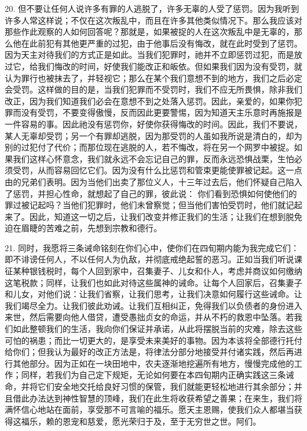 20. 但不要让任何人说许多有罪的人逃脱了，许多无辜的人受了惩罚。因为我听到许多人常这样说；不仅在这次叛乱中，而且在许多其他类似情况下。那么我应该对那些作此观察的人如何回答呢？那就是，如果被捉的人在这次叛乱中是无辜的，那么他在此前犯有其他更严重的过犯，由于他事后没有悔改，就在此时受到了惩罚。因为天主对待我们的方式正是如此。当我们犯罪时，祂并不立即惩罚过犯，而是放过它，给我们悔改的时间，好使我们能改正和皈依。但如果我们因为没有受罚，就认为罪行也被抹去了，并轻视它；那么在某个我们意想不到的地方，我们之后必定会受罚。这样做的目的是，当我们犯罪而不受罚时，我们不应无所畏惧，除非我们改正，因为我们知道我们必会在意想不到之处落入惩罚。因此，亲爱的，如果你犯罪而没有受罚，不要变得傲慢，反而因此更要警惕，因为知道天主乐意时再施报是一件容易的事。因此祂没有惩罚你，好使你获得悔改的时间。因此，我们不要说，某人无辜却受罚；另一个有罪却逃脱，因为那受罚的人虽如我所说是清白的，却为别的过犯付了代价；而那位现在逃脱的人，若不悔改，将在另一个网罗中被捉。如果我们这样心怀意念，我们就永远不会忘记自己的罪，反而永远恐惧战栗，生怕必须受罚，从而容易回忆它们。因为没有什么比惩罚和管束更能使罪被记起。这一点由的兄弟们表明。因为当他们出卖了那位义人，十三年过去后，他们怀疑自己陷入了惩罚，并担心性命，就想起了自己的罪，彼此说：  你们看到恐惧如何使他们的罪过被记起吗？当他们犯罪时，他们未曾察觉；但当他们害怕受罚时，他们就记起来了。因此，知道这一切之后，让我们改变并修正我们的生活；让我们在想到脱免迫在眉睫的苦难之前，先想到宗教和德行。\par

21. 同时，我愿将三条诫命铭刻在你们心中，使你们在四旬期内能为我完成它们：即不诽谤任何人，不以任何人为仇敌，并彻底戒绝起誓的恶习。正如当我们听说课征某种银钱税时，每个人回到家中，召集妻子、儿女和仆人，考虑并商议如何缴纳这笔税款；同样，让我们也如此对待这些属神的诫命。让每个人回家后，召集妻子和儿女，对他们说：让我们省察，让我们思考，让我们决意如何履行这些诫命。让我们竭尽全力。让我们彼此劝诫。让我们互相纠正，免得我们以负债者的身份进入来世，然后需要向他人借贷，遭受愚拙贞女的命运，并从不朽的救恩中坠落。若我们如此整顿我们的生活，我向你们保证并承诺，从此将摆脱当前的灾难，除去这些可怕的祸患；而比一切更大的，是享受未来美好的事物。因为本该将全部德行托付给你们；但我认为最好的改正方法是，将律法分部分地接受并付诸实践，然后再进行其他部分。因为正如在一块田地中，农夫逐渐地挖遍所有地方，慢慢完成他的工作；同样，若我们为自己定下规矩，无论如何要在本四旬期内正确实践这三条诫命，并将它们安全地交托给良好习惯的保管，我们就能更轻松地进行其余部分；并且借此办法达到神性智慧的顶峰，我们在此生将收获希望之善果；在来生，我们将满怀信心地站在面前，享受那不可言喻的福乐。愿天主恩赐，使我们众人都堪当获得这福乐，赖的恩宠和慈爱，愿光荣归于及，至于无穷世之世。阿们。\par

